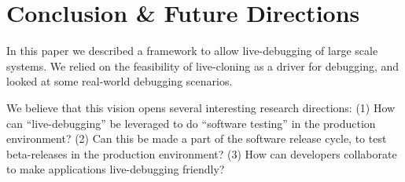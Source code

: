 \section{Conclusion \& Future Directions}
\label{sec:conclusion}

In this paper we described a framework to allow live-debugging of large scale systems.
We relied on the feasibility of live-cloning as a driver for debugging, and looked at some real-world debugging scenarios.

We believe that this vision opens several interesting research directions: 
(1) How can ``live-debugging'' be leveraged to do ``software testing'' in the production environment?
(2) Can this be made a part of the software release cycle, to test beta-releases in the production environment?
(3) How can developers collaborate to make applications live-debugging friendly? 

